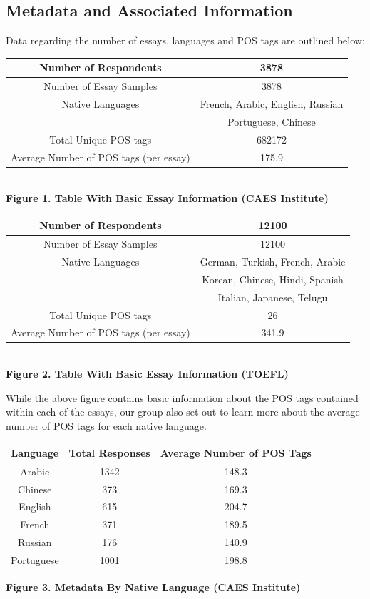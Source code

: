 \documentclass[12pt]{article}
\newcommand\tab[1][1cm]{\hspace*{#1}}
\begin{document}
 \subsection{Metadata and Associated Information}
 \tab Data regarding the number of essays, languages and POS tags are outlined below:
 \begin{center}
 	\begin{tabular}{|c|c|}
 		\hline
 		Number of Respondents & 3878\\
 		\hline
 		Number of Essay Samples & 3878\\
		\hline
		Native Languages & French, Arabic,
		English, Russian\\
		  & Portuguese, Chinese\\
			\hline
		Total Unique POS tags & 682172\\
			\hline
		Average Number of POS tags (per essay) & 175.9\\
			\hline
 	\end{tabular}\\
 	\textbf{Figure 1. Table With Basic Essay Information (CAES Institute)}
 	
 	 \begin{center}
 	 	\begin{tabular}{|c|c|}
 	 		\hline
 	 		Number of Respondents & 12100\\
 	 		\hline
 	 		Number of Essay Samples & 12100\\
 	 		\hline
 	 		Native Languages & German, Turkish, French, Arabic\\
 	 		& Korean, Chinese, Hindi, Spanish \\
 	 		& Italian, Japanese, Telugu\\
 	 		\hline
 	 		Total Unique POS tags & 26\\
 	 		\hline
 	 		Average Number of POS tags (per essay) & 341.9\\
 	 		\hline
 	 	\end{tabular}\\
 	 	\textbf{Figure 2. Table With Basic Essay Information (TOEFL)}
 	 \end{center}
 \end{center}
While the above figure contains basic information about the POS tags contained within each of the essays, our group also set out to learn more about the average number of POS tags for each native language. 
 \begin{center}
 	\begin{tabular}{|c|c|c|}
 		\hline
 		\textbf{Language} & \textbf{Total Responses} & \textbf{Average Number of POS Tags}\\
 		\hline
 		Arabic & 1342 & 148.3\\
 		\hline
 		Chinese & 373 & 169.3\\
 		\hline
 		English & 615 & 204.7\\
 		\hline
 		French & 371 & 189.5\\
 		\hline
 		Russian & 176 & 140.9\\
 		\hline
 		Portuguese & 1001 & 198.8\\
 		\hline
 	\end{tabular}
 	\textbf{Figure 3. Metadata By Native Language (CAES Institute)}
 \end{center}
 
\end{document}
